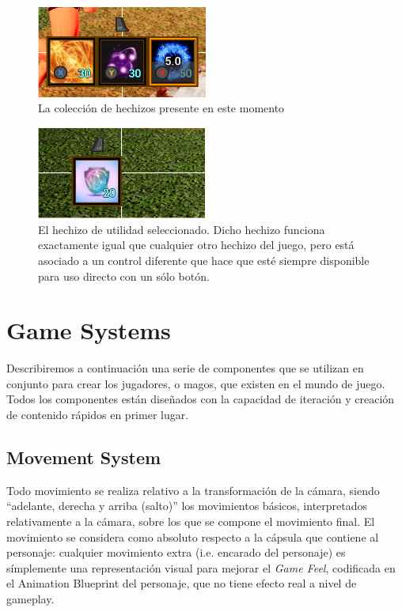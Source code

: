 \documentclass[12pt]{report}
\begin{document}
\begin{figure}[H]
    \centering
    \includegraphics[width=0.5\textwidth]{magic_ui}
	\captionsetup{labelformat=empty}
    \caption{La colección de hechizos presente en este momento}
\end{figure}

\begin{figure}[H]
    \centering
    \includegraphics[width=0.5\textwidth]{magic_utility_ui}
	\captionsetup{labelformat=empty}
    \caption{El hechizo de utilidad seleccionado. Dicho hechizo funciona exactamente igual que cualquier otro hechizo del juego, pero está asociado a un control diferente que hace que esté siempre disponible para uso directo con un sólo botón.}
\end{figure}

\chapter{Game Systems}

Describiremos a continuación una serie de componentes que se utilizan en conjunto para crear los jugadores, o magos, que existen en el mundo de juego. Todos los componentes están diseñados con la capacidad de iteración y creación de contenido rápidos en primer lugar.

\section{Movement System}

Todo movimiento se realiza relativo a la transformación de la cámara, siendo ``adelante, derecha y arriba (salto)'' los movimientos básicos, interpretados relativamente a la cámara, sobre los que se compone el movimiento final. El movimiento se considera como absoluto respecto a la cápsula que contiene al personaje: cualquier movimiento extra (i.e. encarado del personaje) es símplemente una representación visual para mejorar el \textit{Game Feel}, codificada en el Animation Blueprint del personaje, que no tiene efecto real a nivel de gameplay.
\end{document}
